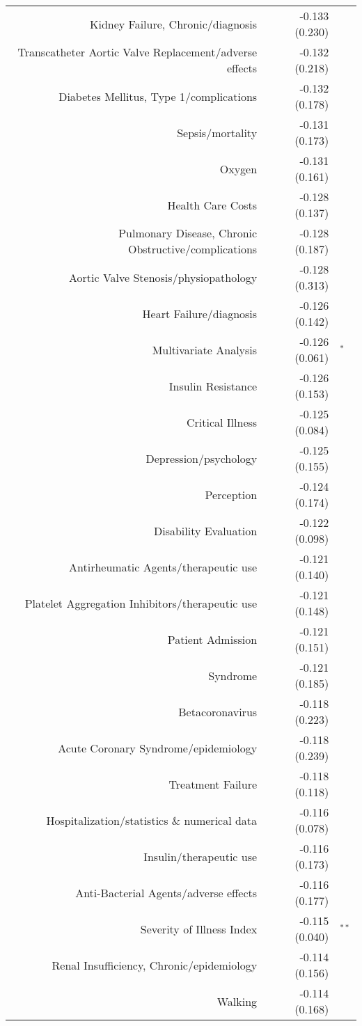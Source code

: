 \begin{longtable}[l]{rr@{}l@{ }}
Kidney Failure, Chronic/diagnosis & -0.133 (0.230) & $^{}$\\
Transcatheter Aortic Valve Replacement/adverse effects & -0.132 (0.218) & $^{}$\\
Diabetes Mellitus, Type 1/complications & -0.132 (0.178) & $^{}$\\
Sepsis/mortality & -0.131 (0.173) & $^{}$\\
Oxygen & -0.131 (0.161) & $^{}$\\
Health Care Costs & -0.128 (0.137) & $^{}$\\
Pulmonary Disease, Chronic Obstructive/complications & -0.128 (0.187) & $^{}$\\
Aortic Valve Stenosis/physiopathology & -0.128 (0.313) & $^{}$\\
Heart Failure/diagnosis & -0.126 (0.142) & $^{}$\\
Multivariate Analysis & -0.126 (0.061) & $^{*}$\\
Insulin Resistance & -0.126 (0.153) & $^{}$\\
Critical Illness & -0.125 (0.084) & $^{}$\\
Depression/psychology & -0.125 (0.155) & $^{}$\\
Perception & -0.124 (0.174) & $^{}$\\
Disability Evaluation & -0.122 (0.098) & $^{}$\\
Antirheumatic Agents/therapeutic use & -0.121 (0.140) & $^{}$\\
Platelet Aggregation Inhibitors/therapeutic use & -0.121 (0.148) & $^{}$\\
Patient Admission & -0.121 (0.151) & $^{}$\\
Syndrome & -0.121 (0.185) & $^{}$\\
Betacoronavirus & -0.118 (0.223) & $^{}$\\
Acute Coronary Syndrome/epidemiology & -0.118 (0.239) & $^{}$\\
Treatment Failure & -0.118 (0.118) & $^{}$\\
Hospitalization/statistics \& numerical data & -0.116 (0.078) & $^{}$\\
Insulin/therapeutic use & -0.116 (0.173) & $^{}$\\
Anti-Bacterial Agents/adverse effects & -0.116 (0.177) & $^{}$\\
Severity of Illness Index & -0.115 (0.040) & $^{**}$\\
Renal Insufficiency, Chronic/epidemiology & -0.114 (0.156) & $^{}$\\
Walking & -0.114 (0.168) & $^{}$\\

\end{longtable}
